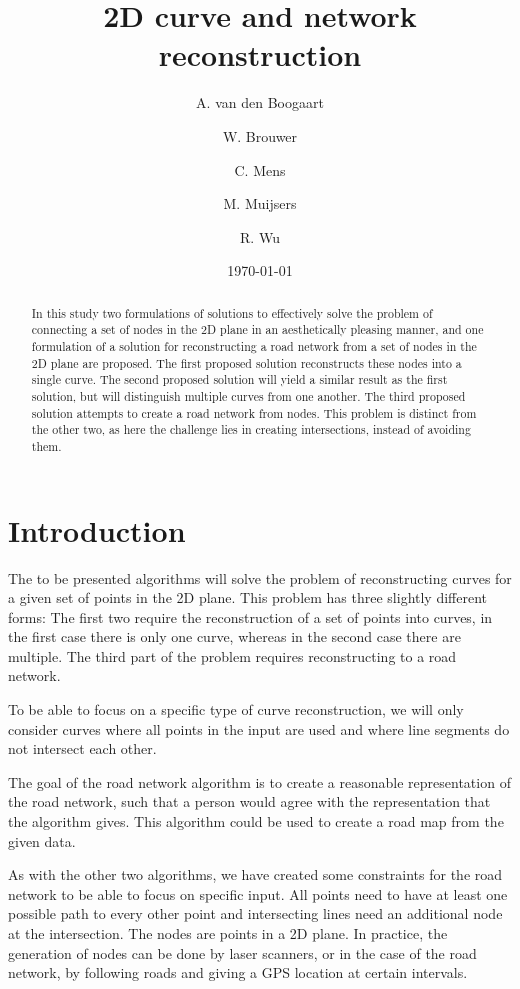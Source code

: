 \documentclass[11pt]{article}
\title{2D curve and network reconstruction}
\author{
A. van den Boogaart \and
W. Brouwer \and
C. Mens \and
M. Muijsers \and
R. Wu
}
\date{\today}
\begin{document}
\newpage

\maketitle

\begin{abstract}
In this study  two formulations of solutions to effectively solve the problem of connecting a set of nodes in the 2D plane in an aesthetically pleasing manner, and one formulation of a solution for reconstructing a road network from a set of nodes in the 2D plane are proposed.
The first proposed solution reconstructs these nodes into a single curve.
The second proposed solution will yield a similar result as the first solution, but will distinguish multiple curves from one another.
The third proposed solution attempts to create a road network from nodes. This problem is distinct from the other two, as here the challenge lies in creating intersections, instead of avoiding them.

\end{abstract}

\section{Introduction}
\label{se:introduction}
The to be presented algorithms will solve the problem of reconstructing curves for a given set of points in the 2D plane. This problem has three slightly different forms: The first two require the reconstruction of a set of points into curves, in the first case there is only one curve, whereas in the second case there are multiple. The third part of the problem requires reconstructing to a road network.

To be able to focus on a specific type of curve reconstruction, we will only consider curves where all points in the input are used and where line segments do not intersect each other.

The goal of the road network algorithm is to create a reasonable representation of the road network, such that a person would agree with the representation that the algorithm gives. This algorithm could be used to create a road map from the given data.

As with the other two algorithms, we have created some constraints for the road network to be able to focus on specific input. All points need to have at least one possible path to every other point and intersecting lines need an additional node at the intersection. The nodes are points in a 2D plane. In practice, the generation of nodes can be done by laser scanners, or in the case of the road network, by following roads and giving a GPS location at certain intervals.
\end{document}
